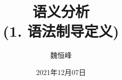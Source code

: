 \documentclass[]{beamer}
\title[语义分析]{语义分析 \\ (1. 语法制导定义)}
\author[魏恒峰]{\large 魏恒峰}
\institute{hfwei@nju.edu.cn}
\date{2021年12月07日}
\begin{document}
\maketitle



\thankyou{}

\end{document}
